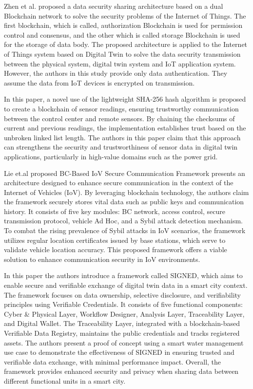 Zhen et al. \cite{zhengBlockchainBasedTrustworthy2022a} proposed a data security sharing architecture based on a dual Blockchain network to solve the security problems of the Internet of Things. The first blockchain, which is called, authorization Blockchain is used for permission control and consensus, and the other which is called storage Blockchain is used for the storage of data body. The proposed architecture is applied to the Internet of Things system based on Digital Twin to solve the data security transmission between the physical system, digital twin system and IoT application system. However, the authors in this study provide only data authentication. They assume the data from IoT devices is encrypted on transmission.  

In \cite{danilczykBlockchainChecksumEstablishing2021a} this paper, a novel use of the lightweight SHA-256 hash algorithm is proposed to create a blockchain of sensor readings, ensuring trustworthy communication between the control center and remote sensors. By chaining the checksums of current and previous readings, the implementation establishes trust based on the unbroken linked list length. The authors in this paper claim that this approach can strengthens the security and trustworthiness of sensor data in digital twin applications, particularly in high-value domains such as the power grid.

Lie et.al \cite{liuBlockchainBasedSecureCommunication2022a} proposed BC-Based IoV Secure Communication Framework presents an architecture designed to enhance secure communication in the context of the Internet of Vehicles (IoV). By leveraging blockchain technology, the authors claim the framework securely stores vital data such as public keys and communication history. It consists of five key modules: BC network, access control, secure transmission protocol, vehicle Ad Hoc, and a Sybil attack detection mechanism. To combat the rising prevalence of Sybil attacks in IoV scenarios, the framework utilizes regular location certificates issued by base stations, which serve to validate vehicle location accuracy. This proposed framework offers a viable solution to enhance communication security in IoV environments.

In \cite{pervezSIGNEDSmartCIty2023a} this paper the authors introduce a framework called SIGNED, which aims to enable secure and verifiable exchange of digital twin data in a smart city context. The framework focuses on data ownership, selective disclosure, and verifiability principles using Verifiable Credentials. It consists of five functional components: Cyber \& Physical Layer, Workflow Designer, Analysis Layer, Traceability Layer, and Digital Wallet. The Traceability Layer, integrated with a blockchain-based Verifiable Data Registry, maintains the public credentials and tracks registered assets. The authors present a proof of concept using a smart water management use case to demonstrate the effectiveness of SIGNED in ensuring trusted and verifiable data exchange, with minimal performance impact. Overall, the framework provides enhanced security and privacy when sharing data between different functional units in a smart city.

